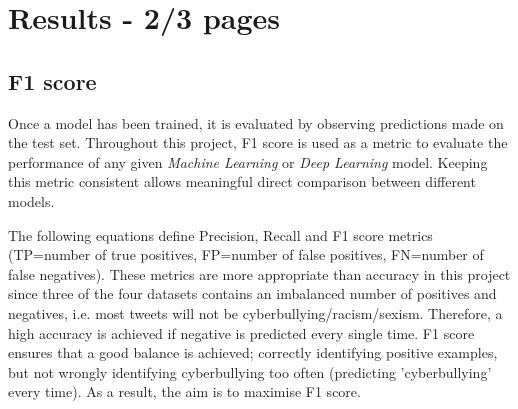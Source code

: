 \documentclass[12pt,a4paper]{article}
\begin{document}
\section{Results - 2/3 pages}

\subsection{F1 score}
Once a model has been trained, it is evaluated by observing predictions made on the test set. Throughout this project, F1 score is used as a metric to evaluate the performance of any given \textit{Machine Learning} or \textit{Deep Learning} model. Keeping this metric consistent allows meaningful direct comparison between different models.

The following equations define Precision, Recall and F1 score metrics (TP=number of true positives, FP=number of false positives, FN=number of false negatives). These metrics are more appropriate than accuracy in this project since three of the four datasets contains an imbalanced number of positives and negatives, i.e. most tweets will not be cyberbullying/racism/sexism. Therefore, a high accuracy is achieved if negative is predicted every single time. F1 score ensures that a good balance is achieved; correctly identifying positive examples, but not wrongly identifying cyberbullying too often (predicting 'cyberbullying' every time). As a result, the aim is to maximise F1 score.
\end{document}
